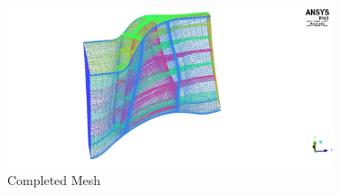 \begin{figure}[t!]
\centering %
\includegraphics[width=0.85\textwidth]{Pictures/r67_ransmesh.jpg}
\caption{Completed Mesh}
\label{meshfinal}
\end{figure}

%
%
%
